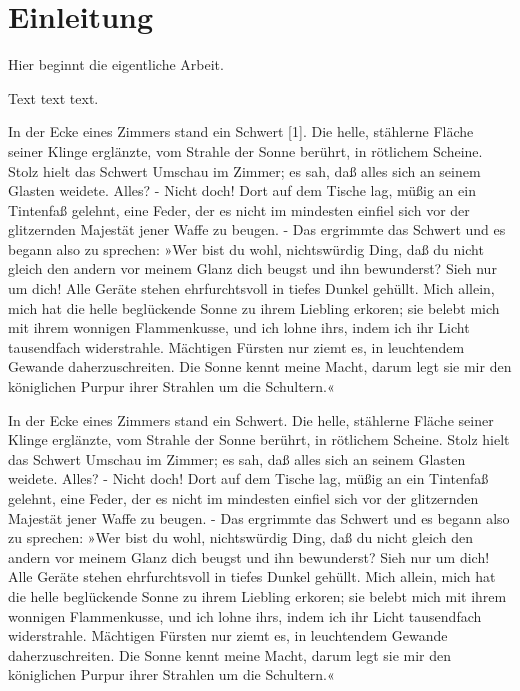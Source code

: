 \chapter{Einleitung}\label{einleitung}

\begin{spacing}{1.3}
Hier beginnt die eigentliche Arbeit.

Text text text.

In der Ecke eines Zimmers stand ein Schwert [1]. Die helle, stählerne Fläche seiner
Klinge erglänzte, vom Strahle der Sonne berührt, in rötlichem Scheine. Stolz
hielt das Schwert Umschau im Zimmer; es sah, daß alles sich an seinem Glasten
weidete. Alles? - Nicht doch! Dort auf dem Tische lag, müßig an ein Tintenfaß
gelehnt, eine Feder, der es nicht im mindesten einfiel sich vor der
glitzernden Majestät jener Waffe zu beugen. - Das ergrimmte das Schwert und es
begann also zu sprechen: »Wer bist du wohl, nichtswürdig Ding, daß du nicht
gleich den andern vor meinem Glanz dich beugst und ihn bewunderst? Sieh nur
um dich! Alle Geräte stehen ehrfurchtsvoll in tiefes Dunkel gehüllt. Mich
allein, mich hat die helle beglückende Sonne zu ihrem Liebling erkoren; sie
belebt mich mit ihrem wonnigen Flammenkusse, und ich lohne ihrs, indem ich ihr
Licht tausendfach widerstrahle. Mächtigen Fürsten nur ziemt es, in leuchtendem
Gewande daherzuschreiten. Die Sonne kennt meine Macht, darum legt sie mir den
königlichen Purpur ihrer Strahlen um die Schultern.«
\end{spacing}
In der Ecke eines Zimmers stand ein Schwert. Die helle, stählerne Fläche seiner
Klinge erglänzte, vom Strahle der Sonne berührt, in rötlichem Scheine. Stolz
hielt das Schwert Umschau im Zimmer; es sah, daß alles sich an seinem Glasten
weidete. Alles? - Nicht doch! Dort auf dem Tische lag, müßig an ein Tintenfaß
gelehnt, eine Feder, der es nicht im mindesten einfiel sich vor der
glitzernden Majestät jener Waffe zu beugen. - Das ergrimmte das Schwert und es
begann also zu sprechen: »Wer bist du wohl, nichtswürdig Ding, daß du nicht
gleich den andern vor meinem Glanz dich beugst und ihn bewunderst? Sieh nur
um dich! Alle Geräte stehen ehrfurchtsvoll in tiefes Dunkel gehüllt. Mich
allein, mich hat die helle beglückende Sonne zu ihrem Liebling erkoren; sie
belebt mich mit ihrem wonnigen Flammenkusse, und ich lohne ihrs, indem ich ihr
Licht tausendfach widerstrahle. Mächtigen Fürsten nur ziemt es, in leuchtendem
Gewande daherzuschreiten. Die Sonne kennt meine Macht, darum legt sie mir den
königlichen Purpur ihrer Strahlen um die Schultern.«

